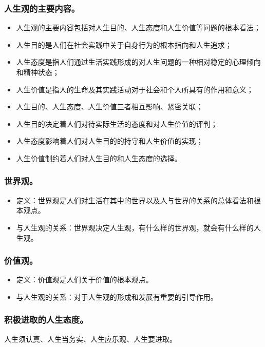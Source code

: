 \documentclass{article}
\begin{document}
\subsubsection{人生观的主要内容。}

\begin{itemize}
    \item 人生观的主要内容包括对人生目的、人生态度和人生价值等问题的根本看法；
    \item 人生目的是人们在社会实践中关于自身行为的根本指向和人生追求；
    \item 人生态度是指人们通过生活实践形成的对人生问题的一种相对稳定的心理倾向和精神状态；
    \item 人生价值是指人的生命及其实践活动对于社会和个人所具有的作用和意义；
    \item 人生目的、人生态度、人生价值三者相互影响、紧密关联；
    \item 人生目的决定着人们对待实际生活的态度和对人生价值的评判；
    \item 人生态度影响着人们对人生目的的持守和人生价值的实现；
    \item 人生价值制约着人们对人生目的和人生态度的选择。
\end{itemize}

\subsubsection{世界观。}
\begin{itemize}
    \item 定义：世界观是人们对生活在其中的世界以及人与世界的关系的总体看法和根本观点。
    \item 与人生观的关系：世界观决定人生观，有什么样的世界观，就会有什么样的人生观。
\end{itemize}

\subsubsection{价值观。}
\begin{itemize}
    \item 定义：价值观是人们关于价值的根本观点。
    \item 与人生观的关系：对于人生观的形成和发展有重要的引导作用。
\end{itemize}

\subsubsection{积极进取的人生态度。}
人生须认真、人生当务实、人生应乐观、人生要进取。
\end{document}
